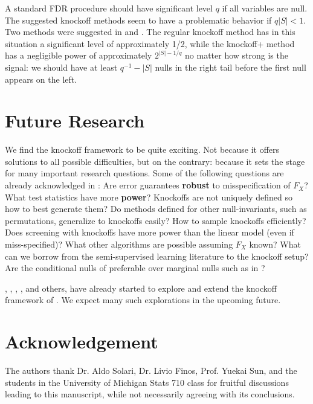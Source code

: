 \documentclass[article,lineno]{biometrika}
\begin{document}
	A standard FDR procedure should have significant level $q$ if all variables are null. The suggested knockoff methods seem to have a problematic behavior if $q|S|<1$. Two methods were suggested in \citet{BarberControllingfalsediscovery2015} and \citet{CandesPanninggoldmodelX2018}. The regular knockoff method has in this situation a significant level of approximately 1/2, while the knockoff+ method has a negligible power of approximately $2^{|S|-1/q}$ no matter how strong is the signal: we should have at least $q^{-1}-|S|$ nulls in the right tail before the first null appears on the left.

	
	
	\section{Future Research}
	
	We find the knockoff framework to be quite exciting.
	Not because it offers solutions to all possible difficulties, but on the contrary: because it sets the stage for many important research questions.
	Some of the following questions are already acknowledged in \citet[Sec.7.2]{CandesPanninggoldmodelX2018}:
	Are error guarantees \textbf{robust} to misspecification of $F_X$?
	What test statistics have more \textbf{power}?
	Knockoffs are not uniquely defined so how to best generate them?
	Do methods defined for other null-invariants, such as permutations, generalize to knockoffs easily?
	How to sample knockoffs efficiently?
	Does screening with knockoffs have more power than the linear model (even if miss-specified)?
	What other algorithms are possible assuming $F_X$ known?
	What can we borrow from the semi-supervised learning literature to the knockoff setup?
	Are the conditional nulls of \cite{SesiaGenehuntinghidden} preferable over marginal nulls such as in \cite{TusherSignificanceanalysismicroarrays2001}?
	
	\cite{DaiknockofffilterFDR2016}, \cite{JansonFamilywiseerrorrate2016}, \cite{ChenAnalysisKnockoffFilter2017}, \cite{ChenPseudoKnockoffFilter2017}, and others, have already started to explore and extend the knockoff framework of \cite{BarberControllingfalsediscovery2015}.
	We expect many such explorations in the upcoming future.
	
	
	
	\section*{Acknowledgement}
	The authors thank  Dr. Aldo Solari, Dr. Livio Finos, Prof. Yuekai Sun, and the students in the University of Michigan Stats 710 class for fruitful discussions leading to this manuscript, while not necessarily agreeing with its conclusions.
	
	
	
	
	
	
	
\end{document}
